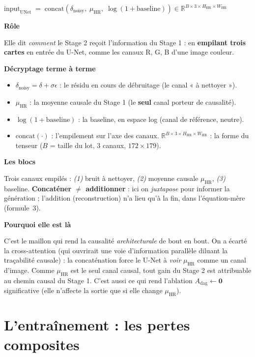 \documentclass[11pt,a4paper]{article}
\newcommand{\HR}{\ensuremath{\mathrm{HR}}}
\newcommand{\muHR}{\ensuremath{\mu_{\HR}}}
\newcommand{\Adag}{\ensuremath{A_{\mathrm{dag}}}}
\newcommand{\bloc}[1]{\par\medskip\noindent\textcolor{accent}{\textbf{#1}}\par\nopagebreak\smallskip}
\begin{document}
\begin{formulebox}
\centering $\mathrm{input}_{\mathrm{UNet}} \;=\; \mathrm{concat}\!\left( \delta_{\mathrm{noisy}},\; \muHR,\; \log(1 + \mathrm{baseline}) \right) \in \mathbb{R}^{B \times 3 \times H_{\HR} \times W_{\HR}}$
\end{formulebox}

\bloc{Rôle}
Elle dit \emph{comment} le Stage 2 reçoit l'information du Stage 1 : en \textbf{empilant trois cartes} en entrée du U-Net, comme les canaux R, G, B d'une image couleur.

\bloc{Décryptage terme à terme}
\begin{itemize}[nosep]
  \item $\delta_{\mathrm{noisy}} = \delta + \sigma\epsilon$ : le résidu en cours de débruitage (le canal « à nettoyer »).
  \item $\muHR$ : la moyenne causale du Stage 1 (le \textbf{seul} canal porteur de causalité).
  \item $\log(1+\mathrm{baseline})$ : la baseline, en espace log (canal de référence, neutre).
  \item $\mathrm{concat}(\cdot)$ : l'empilement sur l'axe des canaux. $\mathbb{R}^{B\times 3\times H_{\HR}\times W_{\HR}}$ : la forme du tenseur ($B$ = taille du lot, $3$ canaux, $172\times179$).
\end{itemize}

\bloc{Les blocs}
Trois canaux empilés : \emph{(1)} bruit à nettoyer, \emph{(2)} moyenne causale $\muHR$, \emph{(3)} baseline. \textbf{Concaténer $\ne$ additionner} : ici on \emph{juxtapose} pour informer la génération ; l'addition (reconstruction) n'a lieu qu'à la fin, dans l'équation-mère (formule~3).

\bloc{Pourquoi elle est là}
C'est le maillon qui rend la causalité \emph{architecturale} de bout en bout. On a écarté la cross-attention (qui ouvrirait une voie d'information parallèle diluant la traçabilité causale) : la concaténation force le U-Net à \emph{voir} $\muHR$ comme un canal d'image. Comme $\muHR$ est le seul canal causal, tout gain du Stage 2 est attribuable au chemin causal du Stage 1. C'est aussi ce qui rend l'ablation $\Adag\leftarrow\mathbf{0}$ significative (elle n'affecte la sortie que si elle change $\muHR$).

\section{L'entraînement : les pertes composites}
\end{document}
